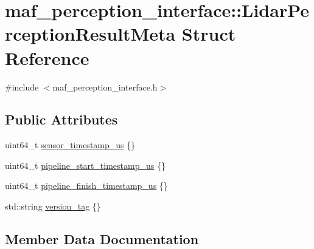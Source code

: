 \hypertarget{structmaf__perception__interface_1_1LidarPerceptionResultMeta}{}\section{maf\+\_\+perception\+\_\+interface\+:\+:Lidar\+Perception\+Result\+Meta Struct Reference}
\label{structmaf__perception__interface_1_1LidarPerceptionResultMeta}


{\ttfamily \#include $<$maf\+\_\+perception\+\_\+interface.\+h$>$}

\subsection*{Public Attributes}
\begin{DoxyCompactItemize}
\item 
uint64\+\_\+t \hyperlink{structmaf__perception__interface_1_1LidarPerceptionResultMeta_a9f5365fd7430e643699e196edc70c79f}{sensor\+\_\+timestamp\+\_\+us} \{\}
\item 
uint64\+\_\+t \hyperlink{structmaf__perception__interface_1_1LidarPerceptionResultMeta_a3dc9edf79f0a553e552c67f0de877a8b}{pipeline\+\_\+start\+\_\+timestamp\+\_\+us} \{\}
\item 
uint64\+\_\+t \hyperlink{structmaf__perception__interface_1_1LidarPerceptionResultMeta_a305deadb2533cf124e662407de18198e}{pipeline\+\_\+finish\+\_\+timestamp\+\_\+us} \{\}
\item 
std\+::string \hyperlink{structmaf__perception__interface_1_1LidarPerceptionResultMeta_abb1720ec9fe7e5fb3372bd06320cbb55}{version\+\_\+tag} \{\}
\end{DoxyCompactItemize}


\subsection{Member Data Documentation}
\mbox{\label{structmaf__perception__interface_1_1LidarPerceptionResultMeta_a305deadb2533cf124e662407de18198e}} 
